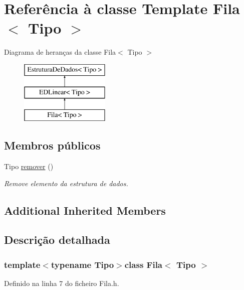 \hypertarget{classFila}{\section{Referência à classe Template Fila$<$ Tipo $>$}
\label{classFila}
}
Diagrama de heranças da classe Fila$<$ Tipo $>$\begin{figure}[H]
\begin{center}
\leavevmode
\includegraphics[height=3.000000cm]{classFila}
\end{center}
\end{figure}
\subsection*{Membros públicos}
\begin{DoxyCompactItemize}
\item 
Tipo \hyperlink{classFila_a687d9d8738e4aabeed0d7025e26d36d5}{remover} ()
\begin{DoxyCompactList}\small\item\em Remove elemento da estrutura de dados. \end{DoxyCompactList}\end{DoxyCompactItemize}
\subsection*{Additional Inherited Members}


\subsection{Descrição detalhada}
\subsubsection*{template$<$typename Tipo$>$class Fila$<$ Tipo $>$}



Definido na linha 7 do ficheiro Fila.\-h.



